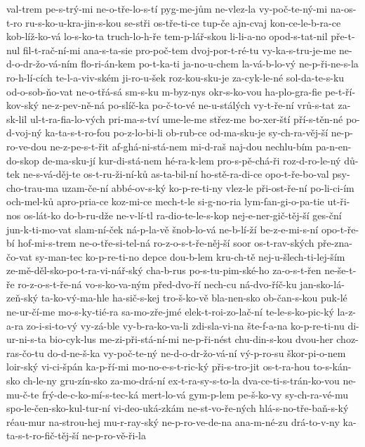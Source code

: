 val-trem
pe-s-trý-mi
ne-o-tře-lo-s-tí
pyg-me-jům
ne-vlez-la
vy-poč-te-ný-mi
na-os-t-ro
ru-s-ko-u-kra-jin-s-kou
se-stři
os-tře-ti-ce
tup-če
ajn-cvaj
kon-ce-le-b-ra-ce
kob-líž-ko-vá
lo-s-ko-ta
truch-lo-h-ře
tem-p-lář-skou
li-li-a-no
opod-s-tat-nil
pře-t-nul
fil-t-rač-ní-mi
ana-s-ta-sie
pro-poč-tem
dvoj-por-t-ré-tu
vy-ka-s-tru-je-me
ne-d-o-dr-žo-vá-ním
flo-ri-án-kem
po-t-ka-ti
ja-no-u-chem
la-vá-b-lo-vý
ne-p-ři-ne-s-la
ro-h-lí-cích
te-l-a-viv-ském
ji-ro-u-šek
roz-kou-sku-je
za-cyk-le-né
sol-da-te-s-ku
od-o-sob-ňo-vat
ne-o-třá-sá
sm-s-ku
m-byz-nys
okr-s-ko-vou
ha-plo-gra-fie
pe-t-ří-kov-ský
ne-z-pev-ně-ná
po-slíč-ka
po-č-to-vé
ne-u-stálých
vy-t-ře-ní
vrů-s-tat
za-sk-lil
ul-t-ra-fia-lo-vých
pri-ma-s-tví
ume-le-me
střez-me
bo-xer-ští
pří-s-těn-né
po-d-voj-ný
ka-ta-s-t-ro-fou
po-z-lo-bi-li
ob-rub-ce
od-ma-sku-je
sy-ch-ra-věj-ší
ne-p-ro-ve-dou
ne-z-pe-s-t-řit
af-ghá-ni-stá-nem
mi-d-raš
naj-dou
nechlu-bím
pa-n-en-do-skop
de-ma-sku-jí
kur-di-stá-nem
hé-ra-k-lem
pro-s-pě-chá-ři
roz-d-ro-le-ný
dů-tek
ne-s-vá-děj-te
os-t-ru-ži-ní-ků
as-ta-bil-ní
ho-stě-ra-di-ce
opo-t-ře-bo-val
psy-cho-trau-ma
uzam-če-ní
abbé-ov-s-ký
ko-p-re-ti-ny
vlez-le
při-ost-ře-ní
po-li-ci-ím
och-mel-ků
apro-pria-ce
koz-mi-ce
mech-t-le
si-g-no-ria
lym-fan-gi-o-pa-tie
ut-ři-nos
os-lát-ko
do-b-ru-dže
ne-v-lí-tl
ra-dio-te-le-s-kop
nej-e-ner-gič-těj-ší
ges-ční
jun-k-ti-mo-vat
slam-ní-ček
ná-p-la-vě
šnob-lo-vá
ne-b-lí-ží
be-z-e-mi-s-ní
opo-t-ře-bí
hof-mi-s-trem
ne-o-tře-si-tel-ná
ro-z-o-s-t-ře-něj-ší
soor
os-t-rav-ských
pře-zna-čo-vat
sy-man-tec
ko-p-re-ti-no
depce
dou-b-lem
kru-ch-tě
nej-u-šlech-ti-lej-ším
ze-mě-děl-sko-po-t-ra-vi-nář-ský
cha-b-rus
po-s-tu-pim-ské-ho
za-o-s-t-řen
ne-še-t-ře
ro-z-o-s-t-ře-ná
vo-s-ko-va-ným
před-dvo-ří
nech-cu
ná-dvo-říč-ku
jan-sko-lá-zeň-ský
ta-ko-vý-ma-hle
ha-sič-s-kej
tro-š-ko-vě
bla-nen-sko
ob-čan-s-kou
puk-lé
ne-ur-čí-me
mo-s-ky-tié-ra
sa-mo-zře-jmé
elek-t-roi-zo-lač-ní
te-le-s-ko-pic-ký
la-z-a-ra
zo-i-si-to-vý
vy-zá-ble
vy-b-ra-ko-va-li
zdi-sla-vi-na
šte-f-a-na
ko-p-re-ti-nu
di-ur-ni-s-ta
bio-cyk-lus
me-zi-při-stá-ní-mi
ne-p-ři-nést
chu-din-s-kou
dvou-her
choz-ras-čo-tu
do-d-ne-š-ka
vy-poč-te-ný
ne-d-o-dr-žo-vá-ní
vý-p-ro-su
škor-pi-o-nem
loir-ský
vi-ci-špán
ka-p-ří-mi
mo-no-e-s-t-ric-ký
při-s-tro-jit
os-t-ra-hou
to-s-kán-sko
ch-le-ny
gru-zín-sko
za-mo-drá-ní
ex-t-ra-sy-s-to-la
dva-ce-ti-s-trán-ko-vou
ne-mu-č-te
frý-de-c-ko-mí-s-tec-ká
mert-lo-vá
gym-p-lem
pe-š-ko-vy
sy-ch-ra-vé-mu
spo-le-čen-sko-kul-tur-ní
vi-deo-uká-zkám
ne-st-vo-ře-ných
hlá-s-no-tře-baň-s-ký
réau-mur
na-strou-hej
mu-r-ray-ský
ne-p-ro-ve-de-na
ana-m-né-zu
drá-to-v-ny
ka-ta-s-t-ro-fič-těj-ší
ne-p-ro-vě-ři-la
